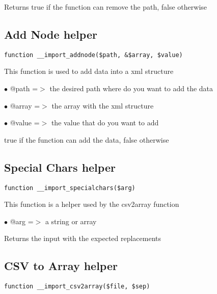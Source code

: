 \documentclass[a4paper]{book}
\begin{document}
Returns true if the function can remove the path, false otherwise

\hypertarget{toc151}{}
\subsection{Add Node helper}

\begin{lstlisting}
function __import_addnode($path, &$array, $value)
\end{lstlisting}

This function is used to add data into a xml structure

\begin{compactitem}
\item[\color{myblue}$\bullet$] @path  =$>$ the desired path where do you want to add the data
\item[\color{myblue}$\bullet$] @array =$>$ the array with the xml structure
\item[\color{myblue}$\bullet$] @value =$>$ the value that do you want to add
\end{compactitem}

true if the function can add the data, false otherwise

\hypertarget{toc152}{}
\subsection{Special Chars helper}

\begin{lstlisting}
function __import_specialchars($arg)
\end{lstlisting}

This function is a helper used by the csv2array function

\begin{compactitem}
\item[\color{myblue}$\bullet$] @arg =$>$ a string or array
\end{compactitem}

Returns the input with the expected replacements

\hypertarget{toc153}{}
\subsection{CSV to Array helper}

\begin{lstlisting}
function __import_csv2array($file, $sep)
\end{lstlisting}
\end{document}
